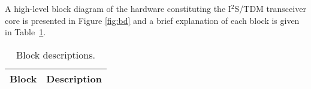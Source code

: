 
A high-level block diagram of the hardware constituting the I$^2$S/TDM
transceiver core is presented in Figure \ref{fig:bd} and a brief explanation of
each block is given in Table~\ref{tab:blocks}.



\begin{table}[H]
  \centering
    \begin{tabularx}{\textwidth}{ | c | X | }
    \hline
    \rowcolor{iob-green}
    {\bf Block} & {\bf Description} \\ \hline
    
    

    \end{tabularx}
  \caption{Block descriptions.}
  \label{tab:blocks}
\end{table}
